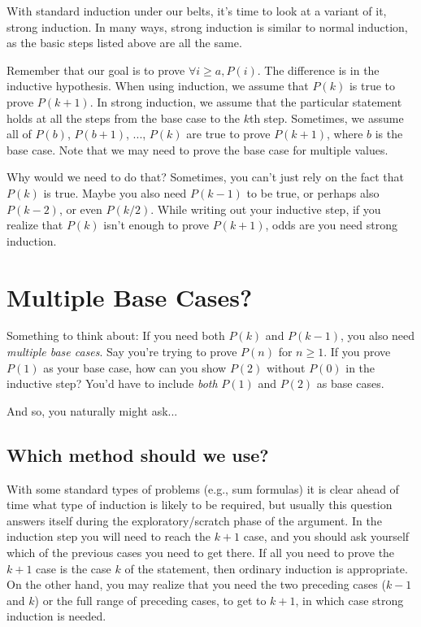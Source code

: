 \documentclass[12pt,letterpaper]{article}
\begin{document}
With standard induction under our belts, it's time to look at a variant of it, strong induction. In many ways, strong induction is similar to normal induction, as the basic steps listed above are all the same.

Remember that our goal is to prove $\forall i\geq a,  P(i)$.
The difference is in the inductive hypothesis. When using induction, we assume that $P(k)$ is true to prove $P(k+1)$. In strong induction, we assume that the particular statement holds at all the steps from the base case to the $k$th step. Sometimes, we assume all of $P(b)$, $P(b+1)$, ..., $P(k)$ are true to prove $P(k+1)$, where $b$ is the base case. Note that we may need to prove the base case for multiple values. 

Why would we need to do that? Sometimes, you can't just rely on the fact that $P(k)$ is true. Maybe you also need $P(k-1)$ to be true, or perhaps also $P(k-2)$, or even $P(k/2)$. While writing out your inductive step, if you realize that $P(k)$ isn't enough to prove $P(k+1)$, odds are you need strong induction.

\section*{Multiple Base Cases?}

Something to think about: If you need both $P(k)$ and $P(k-1)$, you also need \textit{multiple base cases}. Say you're trying to prove $P(n)$ for $n \geq 1$. If you prove $P(1)$ as your base case, how can you show $P(2)$ without $P(0)$ in the inductive step? You'd have to include \textit{both} $P(1)$ and $P(2)$ as base cases.

And so, you naturally might ask...

\subsection*{Which method should we use?}

With some standard types of problems (e.g., sum formulas) it is clear ahead of time what type of induction is likely to be required, but usually this question answers itself during the exploratory/scratch phase of the argument. In the induction step you will need to reach the $k + 1$ case, and you should ask yourself which of the previous cases you need to get there. If all you need to prove the $k + 1$ case is the case $k$ of the statement, then ordinary induction is appropriate. On the other hand, you may realize that you need the two preceding cases ($k - 1$ and $k$) or the full range of preceding cases, to get to $k + 1$, in which case strong induction is needed.
\end{document}
